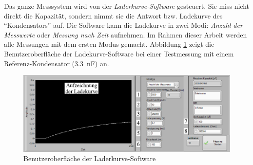 Das ganze Messsystem wird von der \textit{Laderkurve-Software} gesteuert.
Sie miss nicht direkt die Kapazität, sondern nimmt sie die Antwort bzw. Ladekurve des ``Kondensators'' auf.
Die Software kann die Ladekurve in zwei Modi: \emph{Anzahl der Messwerte} oder \emph{Messung nach Zeit} aufnehmen.
Im Rahmen dieser Arbeit werden alle Messungen mit dem ersten Modus gemacht.
Abbildung \ref{fig:gui_der_laderkurve_software} zeigt die Benutzeroberfläche der Ladekurve-Software bei einer Testmessung mit einem Referenz-Kondensator (\SI{3.3}{\nano\farad}) an.
\begin{figure}[htb]
    \centering
    \includegraphics[]{./images/ladekurven_gui.pdf}
    \caption{Benutzeroberfläche der Laderkurve-Software}
    \label{fig:gui_der_laderkurve_software}
\end{figure}

